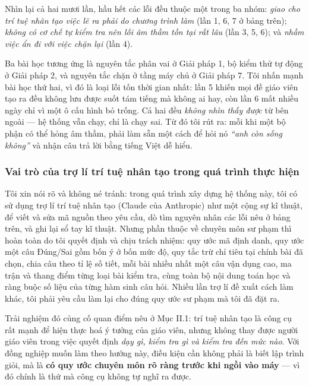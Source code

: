 
Nhìn lại cả hai mươi lần, hầu hết các lỗi đều thuộc một trong ba nhóm:
\textit{giao cho trí tuệ nhân tạo việc lẽ ra phải do chương trình làm} (lần 1,
6, 7 ở bảng trên); \textit{không có cơ chế tự kiểm tra nên lỗi âm thầm tồn tại
rất lâu} (lần 3, 5, 6); và \textit{nhầm việc ẩn đi với việc chặn lại} (lần 4).

Ba bài học tương ứng là nguyên tắc phân vai ở Giải pháp 1, bộ kiểm thử tự động
ở Giải pháp 2, và nguyên tắc chặn ở tầng máy chủ ở Giải pháp 7. Tôi nhấn mạnh
bài học thứ hai, vì đó là loại lỗi tốn thời gian nhất: lần 5 khiến mọi đề giáo
viên tạo ra đều không lưu được suốt tám tiếng mà không ai hay, còn lần 6 mất
nhiều ngày chỉ vì một ô cấu hình bỏ trống. Cả hai đều \textit{không nhìn thấy
được} từ bên ngoài --- hệ thống vẫn chạy, chỉ là chạy sai. Từ đó tôi rút ra:
mỗi khi một bộ phận có thể hỏng âm thầm, phải làm sẵn một cách để hỏi nó
\textit{``anh còn sống không''} và nhận câu trả lời bằng tiếng Việt dễ hiểu.

\subsubsection{Vai trò của trợ lí trí tuệ nhân tạo trong quá trình thực hiện}

Tôi xin nói rõ và không né tránh: trong quá trình xây dựng hệ thống này, tôi có
sử dụng trợ lí trí tuệ nhân tạo (Claude của Anthropic) như một cộng sự kĩ
thuật, để viết và sửa mã nguồn theo yêu cầu, dò tìm nguyên nhân các lỗi nêu ở
bảng trên, và ghi lại sổ tay kĩ thuật. Nhưng phần thuộc về chuyên môn sư phạm
thì hoàn toàn do tôi quyết định và chịu trách nhiệm: quy ước mã định danh, quy
ước một câu Đúng/Sai gồm bốn ý ở bốn mức độ, quy tắc trừ chỉ tiêu tại chính bài
đã chọn, chia câu theo tỉ lệ số tiết, mỗi bài nhiều nhất một câu vận dụng cao,
ma trận và thang điểm từng loại bài kiểm tra, cùng toàn bộ nội dung toán học và
ràng buộc số liệu của từng hàm sinh câu hỏi. Nhiều lần trợ lí đề xuất cách làm
khác, tôi phải yêu cầu làm lại cho đúng quy ước sư phạm mà tôi đã đặt ra.

Trải nghiệm đó củng cố quan điểm nêu ở Mục II.1: trí tuệ nhân tạo là công cụ
rất mạnh để hiện thực hoá ý tưởng của giáo viên, nhưng không thay được người
giáo viên trong việc quyết định \textit{dạy gì, kiểm tra gì và kiểm tra đến mức
nào}. Với đồng nghiệp muốn làm theo hướng này, điều kiện cần không phải là biết
lập trình giỏi, mà là \textbf{có quy ước chuyên môn rõ ràng trước khi ngồi vào
máy} --- vì đó chính là thứ mà công cụ không tự nghĩ ra được.

